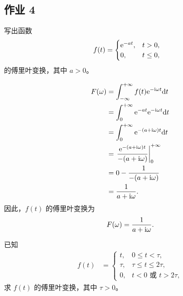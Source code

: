 \subsection{作业 4}

\begin{homework}
    写出函数
    \begin{align*}
        f(t) &= \begin{cases}
            \mathrm{e}^{-at}, & t > 0, \\
            0, & t \leq 0,
        \end{cases}
    \end{align*}
    的傅里叶变换，其中 $a > 0$。
\end{homework}

\begin{solution}
    \begin{align*}
        F(\omega) & = \int_{-\infty}^{+\infty}f(t)\mathrm{e}^{-\mathrm{i}\omega t}\mathrm{d}t \\
        & = \int_{0}^{+\infty}\mathrm{e}^{-at}\mathrm{e}^{-\mathrm{i}\omega t}\mathrm{d}t \\
        & = \int_{0}^{+\infty}\mathrm{e}^{-(a+\mathrm{i}\omega)t}\mathrm{d}t \\
        & = \left.\frac{\mathrm{e}^{-(a+\mathrm{i}\omega)t}}{-(a+\mathrm{i}\omega)}\right|_{0}^{+\infty} \\
        & = 0 - \frac{1}{-(a+\mathrm{i}\omega)} \\
        & = \frac{1}{a+\mathrm{i}\omega}.
    \end{align*}
    因此，$f(t)$ 的傅里叶变换为
    \begin{align*}
        F(\omega) = \frac{1}{a+\mathrm{i}\omega}.
    \end{align*}
\end{solution}

\begin{homework}
    已知
    \begin{align*}
        f(t) &= \begin{cases}
            t, & 0 \le t < \tau, \\
            \tau, & \tau \le t \le 2\tau, \\
            0, & t < 0 \text{ 或 } t > 2\tau,
        \end{cases}
    \end{align*}
    求 $f(t)$ 的傅里叶变换，其中 $\tau > 0$。
\end{homework}

